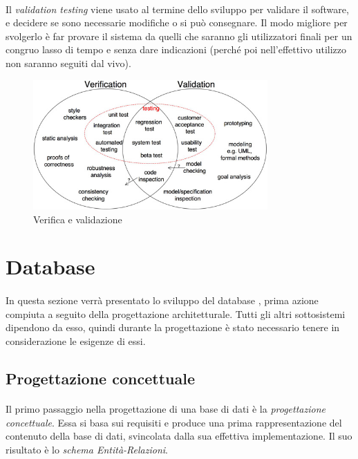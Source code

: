 \documentclass[11pt,a4paper,english]{article}
\begin{document}
\paragraph{} Il \emph{validation testing} viene usato al termine dello sviluppo per validare il software, e decidere se sono necessarie modifiche o si può consegnare. Il modo migliore per svolgerlo è far provare il sistema da quelli che saranno gli utilizzatori finali per un congruo lasso di tempo e senza dare indicazioni (perché poi nell'effettivo utilizzo non saranno seguiti dal vivo). 

\begin{figure}[H]
    \centering
    \includegraphics[width=0.8\textwidth]{img/verifica_validazione.jpg}
    \caption{Verifica e validazione}
\end{figure}



\section{Database}

\paragraph{} In questa sezione verrà presentato lo sviluppo del database \cite{db}, prima azione compiuta a seguito della progettazione architetturale. Tutti gli altri sottosistemi dipendono da esso, quindi durante la progettazione è stato necessario tenere in considerazione le esigenze di essi.

\subsection{Progettazione concettuale}

\paragraph{} Il primo passaggio nella progettazione di una base di dati è la \emph{progettazione concettuale}. Essa si basa sui requisiti e produce una prima rappresentazione del contenuto della base di dati, svincolata dalla sua effettiva implementazione. Il suo risultato è lo \emph{schema Entità-Relazioni}. 
\end{document}
